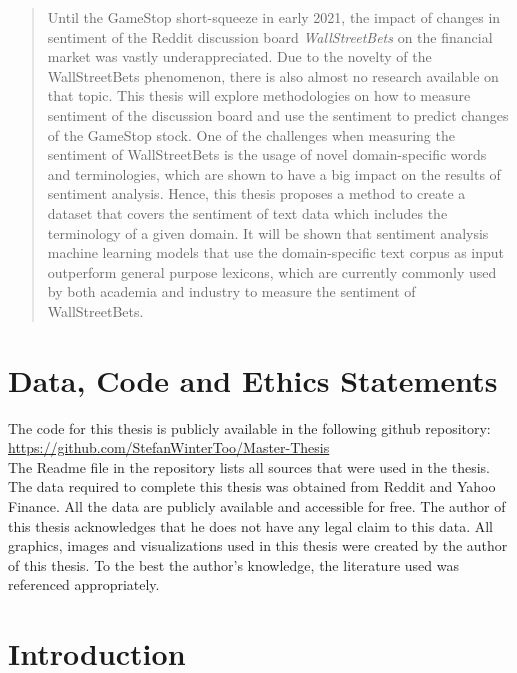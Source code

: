 \documentclass[11pt, a4paper]{article}
\begin{document}


\begin{abstract}
    Until the GameStop short-squeeze in early 2021, the impact of changes in sentiment of the Reddit discussion board \emph{WallStreetBets} on the financial market 
    was vastly underappreciated. 
    Due to the novelty of the WallStreetBets phenomenon, there is also almost no research available on that topic.
    This thesis will explore methodologies on how to measure sentiment of the discussion board and use the sentiment to predict changes of the GameStop stock.
    One of the challenges when measuring the sentiment of WallStreetBets is the usage of novel 
    domain-specific words and terminologies, which are shown to have a big impact on the results of sentiment analysis. Hence, this thesis proposes a method 
    to create a dataset that covers the sentiment of text data which includes the terminology of a given domain. It will be shown that sentiment analysis machine 
    learning models that use the domain-specific text corpus as input outperform general purpose lexicons, which are currently commonly used by both academia and industry 
    to measure the sentiment of WallStreetBets. %
\end{abstract}

\section{Data, Code and Ethics Statements}

\noindent The code for this thesis is publicly available in the following github repository: \url{https://github.com/StefanWinterToo/Master-Thesis}\\
The Readme file in the repository lists all sources that were used in the thesis. The data required to complete this thesis was obtained from Reddit and Yahoo Finance. All the data are publicly available and accessible for free. The author of this thesis acknowledges that he does not have any legal claim to this data.
All graphics, images and visualizations used in this thesis were created by the author of this thesis. To the best the author's knowledge, the literature used was referenced appropriately.

\section{Introduction} \label{sec:introduction}
\end{document}
